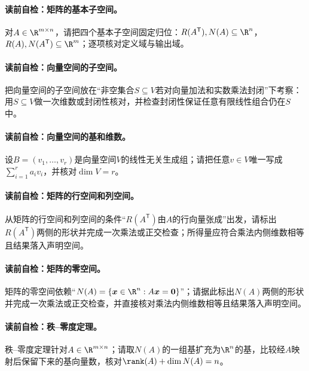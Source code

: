 \paragraph{读前自检：矩阵的基本子空间。}对$A\in\R^{m\times n}$，请把四个基本子空间固定归位：$R(A^{\mathsf T}),N(A)\subseteq\R^n$，$R(A),N(A^{\mathsf T})\subseteq\R^m$；逐项核对定义域与输出域。\par
\paragraph{读前自检：向量空间的子空间。}把向量空间的子空间放在“非空集合$S\subseteq V$若对向量加法和实数乘法封闭”下考察：用$S\subseteq V$做一次维数或封闭性核对，并检查封闭性保证任意有限线性组合仍在$S$中。\par
\paragraph{读前自检：向量空间的基和维数。}设$B=(v_1,\ldots,v_r)$是向量空间$V$的线性无关生成组；请把任意$v\in V$唯一写成$\sum_{i=1}^r a_iv_i$，并核对$\dim V=r$。\par
\paragraph{读前自检：矩阵的行空间和列空间。}从矩阵的行空间和列空间的条件“$R(A^{\mathsf T})$由$A$的行向量张成”出发，请标出$R(A^{\mathsf T})$两侧的形状并完成一次乘法或正交检查；所得量应符合乘法内侧维数相等且结果落入声明空间。\par
\paragraph{读前自检：矩阵的零空间。}矩阵的零空间依赖“$N(A)=\{\boldsymbol{x}\in\R^n:A\boldsymbol{x}=\boldsymbol0\}$”；请据此标出$N(A)$两侧的形状并完成一次乘法或正交检查，并直接核对乘法内侧维数相等且结果落入声明空间。\par
\paragraph{读前自检：秩--零度定理。}秩--零度定理针对$A\in\R^{m\times n}$；请取$N(A)$的一组基扩充为$\R^n$的基，比较经$A$映射后保留下来的基向量数，核对$\rank(A)+\dim N(A)=n$。\par

